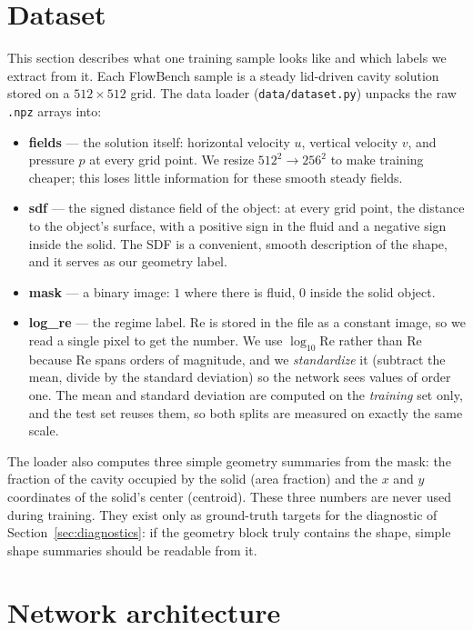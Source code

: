 \documentclass[11pt]{article}
\begin{document}
\section{Dataset}

This section describes what one training sample looks like and which
labels we extract from it. Each FlowBench sample is a steady lid-driven
cavity solution stored on a $512 \times 512$ grid. The data loader
(\texttt{data/dataset.py}) unpacks the raw \texttt{.npz} arrays into:
%
\begin{itemize}
  \item \textbf{fields} --- the solution itself: horizontal velocity $u$,
        vertical velocity $v$, and pressure $p$ at every grid point.
        We resize $512^2 \to 256^2$ to make training cheaper; this loses
        little information for these smooth steady fields.
  \item \textbf{sdf} --- the signed distance field of the object: at
        every grid point, the distance to the object's surface, with a
        positive sign in the fluid and a negative sign inside the solid.
        The SDF is a convenient, smooth description of the shape, and it
        serves as our geometry label.
  \item \textbf{mask} --- a binary image: $1$ where there is fluid, $0$
        inside the solid object.
  \item \textbf{log\_re} --- the regime label. Re is stored in the file
        as a constant image, so we read a single pixel to get the number.
        We use $\log_{10}\mathrm{Re}$ rather than Re because Re spans
        orders of magnitude, and we \emph{standardize} it (subtract the
        mean, divide by the standard deviation) so the network sees
        values of order one. The mean and standard deviation are computed
        on the \emph{training} set only, and the test set reuses them, so
        both splits are measured on exactly the same scale.
\end{itemize}
%
The loader also computes three simple geometry summaries from the mask:
the fraction of the cavity occupied by the solid (area fraction) and the
$x$ and $y$ coordinates of the solid's center (centroid). These three
numbers are never used during training. They exist only as ground-truth
targets for the diagnostic of Section~\ref{sec:diagnostics}: if the
geometry block truly contains the shape, simple shape summaries should be
readable from it.

\section{Network architecture}
\end{document}
